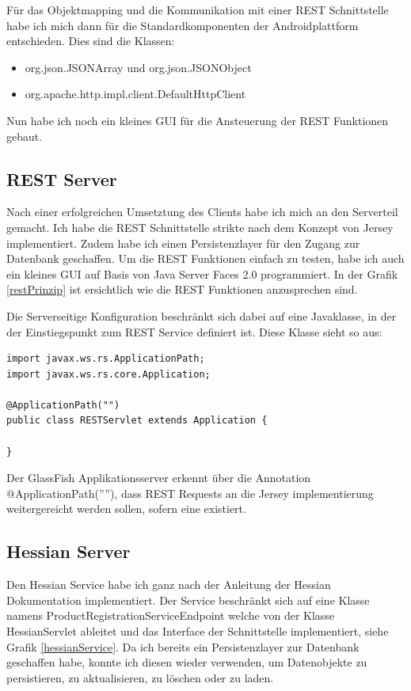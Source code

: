 \documentclass[abstracton, listof=totocnumbered,
bibliography=totocnumbered]{scrreprt}
\begin{document}
  Für das Objektmapping und die Kommunikation mit einer REST Schnittstelle
  habe ich mich dann für die Standardkomponenten der Androidplattform entschieden.
  Dies sind die Klassen:
  
  \begin{itemize}
    \item org.json.JSONArray und org.json.JSONObject
    \item org.apache.http.impl.client.DefaultHttpClient
  \end{itemize}
  
  Nun habe ich noch ein kleines GUI für die Ansteuerung der REST Funktionen
  gebaut.
  
  \subsection{REST Server}
  
  Nach einer erfolgreichen Umsetztung des Clients habe ich mich an den
  Serverteil gemacht. Ich habe die REST Schnittstelle strikte nach dem Konzept von Jersey
  implementiert. Zudem habe ich einen Persistenzlayer für den Zugang zur
  Datenbank geschaffen. Um die REST Funktionen einfach zu testen, habe ich
  auch ein kleines GUI auf Basis von Java Server Faces 2.0 programmiert. In der
  Grafik \ref{restPrinzip} ist ersichtlich wie die REST Funktionen anzusprechen
  sind.
  
  Die Serverseitige Konfiguration beschränkt sich dabei auf eine Javaklasse,
  in der der Einstiegspunkt zum REST Service definiert ist. Diese Klasse sieht
  so aus:

\begin{verbatim}   
import javax.ws.rs.ApplicationPath;
import javax.ws.rs.core.Application;

@ApplicationPath("")
public class RESTServlet extends Application {

}
\end{verbatim}

  Der GlassFish Applikationsserver erkennt über die Annotation
  @ApplicationPath(''''), dass REST Requests an die Jersey implementierung
  weitergereicht werden sollen, sofern eine existiert.
  
  \subsection{Hessian Server}
  
  Den Hessian Service habe ich ganz nach der Anleitung der Hessian Dokumentation
  implementiert. Der Service beschränkt sich auf eine Klasse namens
  ProductRegistrationServiceEndpoint welche von der Klasse HessianServlet
  ableitet und das Interface der Schnittstelle implementiert, siehe Grafik
  \ref{hessianService}. Da ich bereits ein Persistenzlayer zur Datenbank
  geschaffen habe, konnte ich diesen wieder verwenden, um Datenobjekte zu
  persistieren, zu aktualisieren, zu löschen oder zu laden.
  
\end{document}
